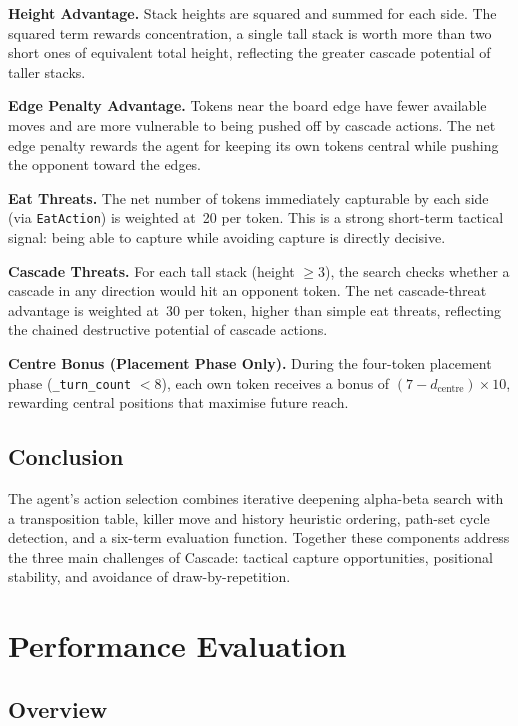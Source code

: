 \documentclass[10.5pt,a4paper]{article}
\begin{document}
\textbf{Height Advantage.}
Stack heights are squared and summed for each side. The squared term rewards concentration, a single tall stack is worth more than two short ones of equivalent total height, reflecting the greater cascade potential of taller stacks.

\textbf{Edge Penalty Advantage.}
Tokens near the board edge have fewer available moves and are more vulnerable to being pushed off by cascade actions. The net edge penalty rewards the agent for keeping its own tokens central while pushing the opponent toward the edges.

\textbf{Eat Threats.}
The net number of tokens immediately capturable by each side (via \texttt{EatAction}) is weighted at~20 per token. This is a strong short-term tactical signal: being able to capture while avoiding capture is directly decisive.

\textbf{Cascade Threats.}
For each tall stack (height $\geq 3$), the search checks whether a cascade in any direction would hit an opponent token. The net cascade-threat advantage is weighted at~30 per token, higher than simple eat threats, reflecting the chained destructive potential of cascade actions.

\textbf{Centre Bonus (Placement Phase Only).}
During the four-token placement phase (\texttt{\_turn\_count} $< 8$), each own token receives a bonus of $(7 - d_{\text{centre}}) \times 10$, rewarding central positions that maximise future reach.

\subsection{Conclusion}

The agent's action selection combines iterative deepening alpha-beta search with a transposition table, killer move and history heuristic ordering, path-set cycle detection, and a six-term evaluation function. Together these components address the three main challenges of Cascade: tactical capture opportunities, positional stability, and avoidance of draw-by-repetition.

\section{Performance Evaluation}
\label{sec:performance}

\subsection{Overview}
\end{document}
